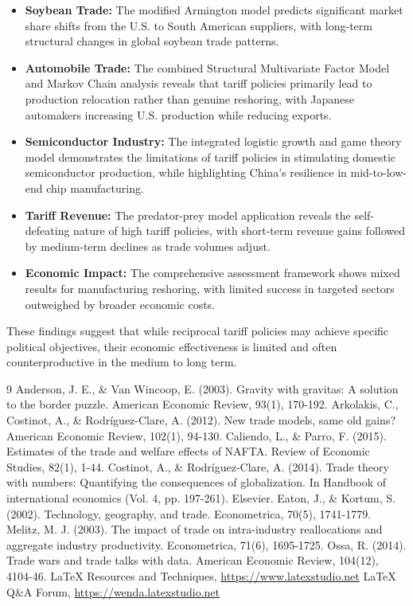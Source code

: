 \documentclass[12pt]{article}
\begin{document}
\begin{itemize}
    \item \textbf{Soybean Trade:} The modified Armington model predicts significant market share shifts from the U.S. to South American suppliers, with long-term structural changes in global soybean trade patterns.
    
    \item \textbf{Automobile Trade:} The combined Structural Multivariate Factor Model and Markov Chain analysis reveals that tariff policies primarily lead to production relocation rather than genuine reshoring, with Japanese automakers increasing U.S. production while reducing exports.
    
    \item \textbf{Semiconductor Industry:} The integrated logistic growth and game theory model demonstrates the limitations of tariff policies in stimulating domestic semiconductor production, while highlighting China's resilience in mid-to-low-end chip manufacturing.
    
    \item \textbf{Tariff Revenue:} The predator-prey model application reveals the self-defeating nature of high tariff policies, with short-term revenue gains followed by medium-term declines as trade volumes adjust.
    
    \item \textbf{Economic Impact:} The comprehensive assessment framework shows mixed results for manufacturing reshoring, with limited success in targeted sectors outweighed by broader economic costs.
\end{itemize}

These findings suggest that while reciprocal tariff policies may achieve specific political objectives, their economic effectiveness is limited and often counterproductive in the medium to long term.

\begin{thebibliography}{9}
 Anderson, J. E., \& Van Wincoop, E. (2003). Gravity with gravitas: A solution to the border puzzle. American Economic Review, 93(1), 170-192.
 Arkolakis, C., Costinot, A., \& Rodríguez-Clare, A. (2012). New trade models, same old gains? American Economic Review, 102(1), 94-130.
 Caliendo, L., \& Parro, F. (2015). Estimates of the trade and welfare effects of NAFTA. Review of Economic Studies, 82(1), 1-44.
 Costinot, A., \& Rodríguez-Clare, A. (2014). Trade theory with numbers: Quantifying the consequences of globalization. In Handbook of international economics (Vol. 4, pp. 197-261). Elsevier.
 Eaton, J., \& Kortum, S. (2002). Technology, geography, and trade. Econometrica, 70(5), 1741-1779.
 Melitz, M. J. (2003). The impact of trade on intra-industry reallocations and aggregate industry productivity. Econometrica, 71(6), 1695-1725.
 Ossa, R. (2014). Trade wars and trade talks with data. American Economic Review, 104(12), 4104-46.
 \LaTeX{} Resources and Techniques, \url{https://www.latexstudio.net}
 \LaTeX{} Q\&A Forum, \url{https://wenda.latexstudio.net}
\end{thebibliography}
\end{document}
